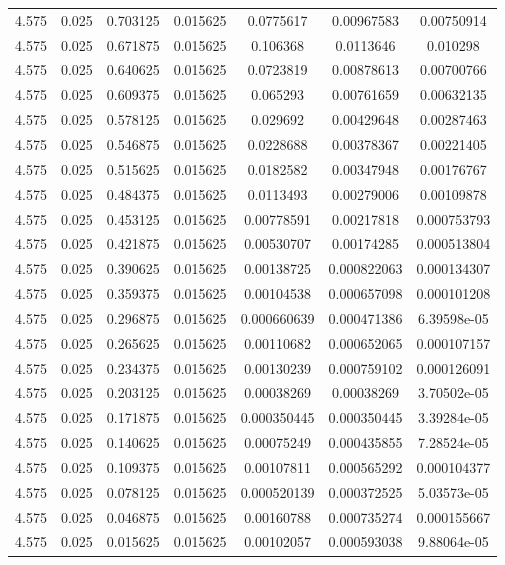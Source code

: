 \begin{flushleft}
\begin{longtable}{ccccccc}
4.575 & 0.025 & 0.703125 & 0.015625 & 0.0775617 & 0.00967583 & 0.00750914  \\ 
4.575 & 0.025 & 0.671875 & 0.015625 & 0.106368 & 0.0113646 & 0.010298  \\ 
4.575 & 0.025 & 0.640625 & 0.015625 & 0.0723819 & 0.00878613 & 0.00700766  \\ 
4.575 & 0.025 & 0.609375 & 0.015625 & 0.065293 & 0.00761659 & 0.00632135  \\ 
4.575 & 0.025 & 0.578125 & 0.015625 & 0.029692 & 0.00429648 & 0.00287463  \\ 
4.575 & 0.025 & 0.546875 & 0.015625 & 0.0228688 & 0.00378367 & 0.00221405  \\ 
4.575 & 0.025 & 0.515625 & 0.015625 & 0.0182582 & 0.00347948 & 0.00176767  \\ 
4.575 & 0.025 & 0.484375 & 0.015625 & 0.0113493 & 0.00279006 & 0.00109878  \\ 
4.575 & 0.025 & 0.453125 & 0.015625 & 0.00778591 & 0.00217818 & 0.000753793  \\ 
4.575 & 0.025 & 0.421875 & 0.015625 & 0.00530707 & 0.00174285 & 0.000513804  \\ 
4.575 & 0.025 & 0.390625 & 0.015625 & 0.00138725 & 0.000822063 & 0.000134307  \\ 
4.575 & 0.025 & 0.359375 & 0.015625 & 0.00104538 & 0.000657098 & 0.000101208  \\ 
4.575 & 0.025 & 0.296875 & 0.015625 & 0.000660639 & 0.000471386 & 6.39598e-05  \\ 
4.575 & 0.025 & 0.265625 & 0.015625 & 0.00110682 & 0.000652065 & 0.000107157  \\ 
4.575 & 0.025 & 0.234375 & 0.015625 & 0.00130239 & 0.000759102 & 0.000126091  \\ 
4.575 & 0.025 & 0.203125 & 0.015625 & 0.00038269 & 0.00038269 & 3.70502e-05  \\ 
4.575 & 0.025 & 0.171875 & 0.015625 & 0.000350445 & 0.000350445 & 3.39284e-05  \\ 
4.575 & 0.025 & 0.140625 & 0.015625 & 0.00075249 & 0.000435855 & 7.28524e-05  \\ 
4.575 & 0.025 & 0.109375 & 0.015625 & 0.00107811 & 0.000565292 & 0.000104377  \\ 
4.575 & 0.025 & 0.078125 & 0.015625 & 0.000520139 & 0.000372525 & 5.03573e-05  \\ 
4.575 & 0.025 & 0.046875 & 0.015625 & 0.00160788 & 0.000735274 & 0.000155667  \\ 
4.575 & 0.025 & 0.015625 & 0.015625 & 0.00102057 & 0.000593038 & 9.88064e-05  \\ 

\end{longtable}
\end{flushleft}
